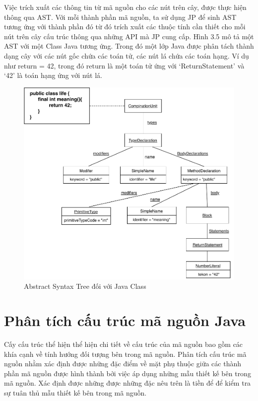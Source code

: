 \documentclass[12pt]{report}
\begin{document}
\noindent Việc trích xuất các thông tin từ mã nguồn cho các nút trên cây, được thực hiện thông qua AST. Với mỗi thành phần mã nguồn, ta sử dụng JP để sinh AST tương ứng với thành phần đó từ đó trích xuất các thuộc tính cần thiết cho mỗi nút trên cây cấu trúc thông qua những API mà JP cung cấp.
Hình 3.5 mô tả một AST với một Class Java tương ứng. Trong đó một lớp Java được phân tách thành dạng cây với các nút gốc chứa các toán tử, các nút lá chứa các toán hạng. Ví dụ như return = 42, trong đó return là một toán tử ứng với `ReturnStatement' và `42' là toán hạng ứng với nút lá.
\begin{figure}[!htbp]
	\vspace{1cm}
	\centering
	\includegraphics[scale=1]{images/ast_pdf}
	\caption{Abstract Syntax Tree đối với Java Class}
	\label{fig:ast_for_java_class}
\end{figure}
\newpage
\section{Phân tích cấu trúc mã nguồn Java}
\indent Cấy cấu trúc thể hiện thể hiện chi tiết về cấu trúc của mã nguồn bao gồm các khía cạnh về tính hướng đối tượng bên trong mã nguồn. Phân tích cấu trúc mã nguồn nhằm xác định được những đặc điểm về mặt phụ thuộc giữa các thành phần mã nguồn được hình thành bởi việc áp dụng những mẫu thiết kế bên trong mã nguồn. Xác định được những được những đặc nêu trên là tiền để để kiểm tra sự tuân thủ mẫu thiết kế bên trong mã nguồn.
\end{document}
